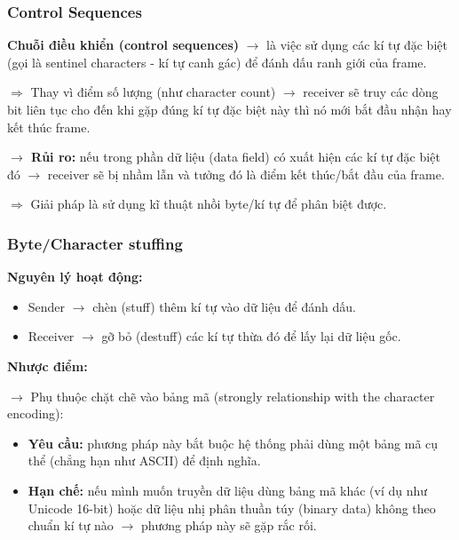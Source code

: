\subsubsection{Control Sequences}

\noindent
\textbf{Chuỗi điều khiển (control sequences)} $\rightarrow$ là việc sử dụng các kí tự đặc biệt (gọi là sentinel characters - kí tự canh gác) để đánh dấu ranh giới của frame.

$\Rightarrow$ Thay vì điểm số lượng (như character count) $\rightarrow$ receiver sẽ truy các dòng bit liên tục cho đến khi gặp đúng kí tự đặc biệt này thì nó mới bắt đầu nhận hay kết thúc frame.
\medskip

\textbf{$\rightarrow$ Rủi ro:} nếu trong phần dữ liệu (data field) có xuất hiện các kí tự đặc biệt đó $\rightarrow$ receiver sẽ bị nhầm lẫn và tưởng đó là điểm kết thúc/bắt đầu của frame.

$\Rightarrow$ Giải pháp là sử dụng kĩ thuật nhồi byte/kí tự để phân biệt được.
\medskip

\subsubsection{Byte/Character stuffing}

\noindent
\textbf{Nguyên lý hoạt động:}

\begin{itemize}
    \item Sender $\rightarrow$ chèn (stuff) thêm kí tự vào dữ liệu để đánh dấu.
    \item Receiver $\rightarrow$ gỡ bỏ (destuff) các kí tự thừa đó để lấy lại dữ liệu gốc.
\end{itemize}
\medskip

\noindent
\textbf{Nhược điểm:}
\medskip

\noindent
$\rightarrow$ Phụ thuộc chặt chẽ vào bảng mã (strongly relationship with the character encoding):

\begin{itemize}
    \item \textbf{Yêu cầu:} phương pháp này bắt buộc hệ thống phải dùng một bảng mã cụ thể (chẳng hạn như ASCII) để định nghĩa.
    \item \textbf{Hạn chế:} nếu mình muốn truyền dữ liệu dùng bảng mã khác (ví dụ như Unicode 16-bit) hoặc dữ liệu nhị phân thuần túy (binary data) không theo chuẩn kí tự nào $\rightarrow$ phương pháp này sẽ gặp rắc rối.
\end{itemize}
\medskip

